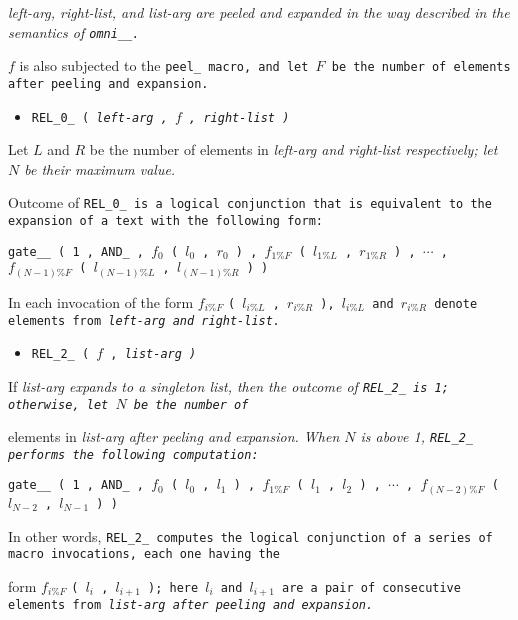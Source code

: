 \it{left-arg}, \it{right-list}, and \it{list-arg} are peeled and
expanded in the way described in the semantics of \tt{omni__}.

$f$ is also subjected to the \tt{peel_} macro, and let
$F$ be the number of elements after peeling and expansion.

\begin{itemize}
\item \tt{REL_0_ (} \it{left-arg} \tt{,} $f$ \tt{,} \it{right-list} \tt{)}
\end{itemize}

Let $L$ and $R$ be the number of elements in \it{left-arg} and
\it{right-list} respectively; let $N$ be their maximum value.

Outcome of \tt{REL_0_} is a logical conjunction that is
equivalent to the expansion of a text with the following form:

\centerline
{
\tt{gate__ ( 1 , AND_ ,}
$f_0$ \tt{(} $l_0$ \tt{,} $r_0$ \tt{) ,}
$f_{1\%F}$ \tt{(} $l_{1\%L}$ \tt{,} $r_{1\%R}$ \tt{) ,}
$\cdots$ \tt{,}
$f_{(N - 1)\%F}$ \tt{(} $l_{(N - 1)\%L}$ \tt{,} $l_{(N - 1)\%R}$ \tt{)}
\tt{)}
}

In each invocation of the form
$f_{i\%F}$ \tt{(} $l_{i\%L}$ \tt{,} $r_{i\%R}$ \tt{)},
$l_{i\%L}$ and $r_{i\%R}$ denote elements from \it{left-arg} and \it{right-list}.

\begin{itemize}
\item \tt{REL_2_ (} $f$ \tt{,} \it{list-arg} \tt{)}
\end{itemize}

If \it{list-arg} expands to a singleton list, then the outcome
of \tt{REL_2_} is \tt{1}; otherwise, let $N$ be the number of

elements in \it{list-arg} after peeling and expansion.
When $N$ is above 1, \tt{REL_2_} performs the following computation:

\centerline
{
\tt{gate__ ( 1 , AND_ ,}
$f_0$ \tt{(} $l_0$ \tt{,} $l_1$ \tt{) ,}
$f_{1\%F}$ \tt{(} $l_1$ \tt{,} $l_2$ \tt{) ,}
$\cdots$ \tt{,}
$f_{(N - 2)\%F}$ \tt{(} $l_{N - 2}$ \tt{,} $l_{N - 1}$ \tt{)}
\tt{)}
}

In other words, \tt{REL_2_} computes the logical conjunction
of a series of macro invocations, each one having the

form $f_{i\%F}$ \tt{(} $l_i$ \tt{,} $l_{i + 1}$ \tt{)};
here $l_i$ and $l_{i + 1}$ are a pair of consecutive
elements from \it{list-arg} after peeling and expansion.\\

